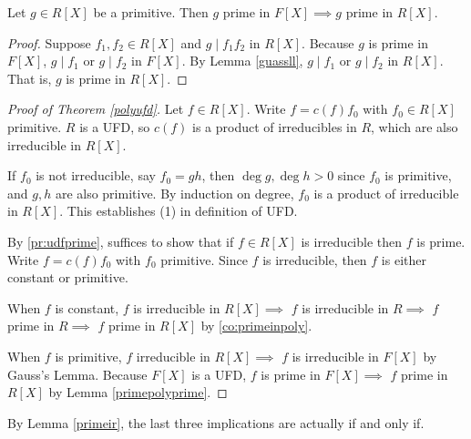 \begin{lemma}{}{}
    \label{primepolyprime}
    Let \(g \in R[X]\) be a primitive. Then \(g\) prime in \(F[X] \implies g\) prime in \(R[X]\).
\end{lemma}
\begin{proof}
    Suppose \(f_1, f_2 \in R[X]\) and \(g \mid f_1 f_2\) in \(R[X]\). Because \(g\) is prime in \(F[X]\), \(g \mid f_1\) or \(g \mid f_2\) in \(F[X]\). By Lemma \eqref{guassll}, \(g \mid f_1\) or \(g \mid f_2\) in \(R[X]\). That is, \(g\) is prime in \(R[X]\).
\end{proof}
\begin{proof}[Proof of Theorem \eqref{polyufd}]
    Let \(f \in R[X]\). Write \(f = c(f) f_0\) with \(f_0\in R[X]\) primitive. \(R\) is a UFD, so \(c(f)\) is a product of irreducibles in \(R\), which are also irreducible in \(R[X]\).

    If \(f_0\) is not irreducible, say \(f_0 = gh\), then \(\deg g, \deg h > 0\) since \(f_0\) is primitive, and \(g, h\) are also primitive. By induction on degree, \(f_0\) is a product of irreducible in \(R[X]\). This establishes (1) in definition of UFD.

    By \cref{pr:udfprime}, suffices to show that if \(f\in R[X]\) is irreducible then \(f\) is prime. Write \(f = c(f) f_0\) with \(f_0\) primitive. Since \(f\) is irreducible, then \(f\) is either constant or primitive.

    When \(f\) is constant, \(f\) is irreducible in \(R[X] \implies\) \(f\) is irreducible in \(R\implies\) \(f\) prime in \(R\implies\) \(f\) prime in \(R[X]\) by \cref{co:primeinpoly}.

    When \(f\) is primitive, \(f\) irreducible in \(R[X]\implies \) \(f\) is irreducible in \(F[X]\) by Gauss's Lemma. Because \(F[X]\) is a UFD, \(f\) is prime in \(F[X]\implies\) \(f\) prime in \(R[X]\) by Lemma \eqref{primepolyprime}.
\end{proof}
\begin{remark}
    By Lemma \eqref{primeir}, the last three implications are actually if and only if.
\end{remark}